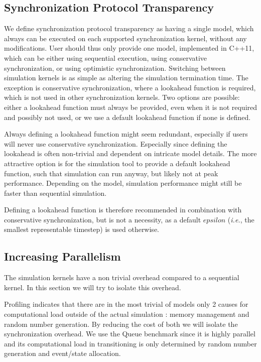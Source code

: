 \subsection{Synchronization Protocol Transparency}
We define synchronization protocol transparency as having a single model, which always can be executed on each supported synchronization kernel, without any modifications.
User should thus only provide one model, implemented in C++11, which can be either using sequential execution, using conservative synchronization, or using optimistic synchronization.
Switching between simulation kernels is as simple as altering the simulation termination time.
The exception is conservative synchronization, where a lookahead function is required, which is not used in other synchronization kernels.
Two options are possible: either a lookahead function must always be provided, even when it is not required and possibly not used, or we use a default lookahead function if none is defined.

Always defining a lookahead function might seem redundant, especially if users will never use conservative synchronization.
Especially since defining the lookahead is often non-trivial and dependent on intricate model details.
The more attractive option is for the simulation tool to provide a default lookahead function, such that simulation can run anyway, but likely not at peak performance.
Depending on the model, simulation performance might still be faster than sequential simulation. 

Defining a lookahead function is therefore recommended in combination with conservative synchronization, but is not a necessity, as a default $epsilon$ (\textit{i.e.}, the smallest representable timestep) is used otherwise.

\subsection{Increasing Parallelism}
The simulation kernels have a non trivial overhead compared to a sequential kernel. In this section we will try to isolate this overhead.

Profiling indicates that there are in the most trivial of models only 2 causes for computational load outside of the actual simulation : memory management and random number generation. By reducing the cost of both we will isolate the synchronization overhead. We use the Queue benchmark since it is highly parallel and its computational load in transitioning is only determined by random number generation and event/state allocation.

